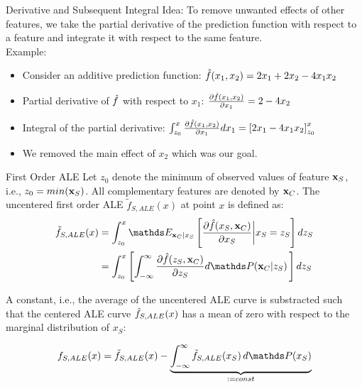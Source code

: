 \documentclass[11pt,compress,t,notes=noshow, xcolor=table]{beamer}
\begin{document}
\begin{vbframe}{Derivative and Subsequent Integral}
Idea: To remove unwanted effects of other features, we take the partial derivative of the prediction function with respect to a feature and integrate it with respect to the same feature. \\
\lz
Example:
\begin{itemize}
\item Consider an additive prediction function: $\fh(x_1, x_2) = 2x_1 + 2x_2 - 4x_1 x_2$
\lz
\item Partial derivative of $\fh$ with respect to $x_1$: $\frac{\partial \fh(x_1, x_2)}{\partial x_1} = 2 - 4x_2$
\lz
\item Integral of the partial derivative:  $\int_{z_0}^{x} \frac{\partial \fh(x_1, x_2)}{\partial x_1} dx_1 = \left[2x_1 - 4x_1 x_2\right]_{z_0}^{x}$
\lz
\item We removed the main effect of $x_2$ which was our goal.
\end{itemize}
\end{vbframe}


\begin{vbframe}{First Order ALE}
Let $z_0$ denote the minimum of observed values of feature $\xv_S$, i.e., $z_0 = min(\xv_S)$. All complementary features are denoted by $\xv_C$. The uncentered first order ALE $\tilde{f}_{S, ALE}(x)$ at point $x$ is defined as:
$$
\begin{aligned}
\tilde{f}_{S, ALE}(x) &= \int_{z_{0}}^{x} \E_{\xv_C \vert x_S} \left[\frac{\partial \fh(x_S, \xv_C)}{\partial x_S} \bigg \vert x_S = z_S \right] dz_S \\
&= \int_{z_{0}}^{x} \left[ \int_{-\infty}^{\infty}  \frac{\partial \fh(z_S, \xv_C)}{\partial z_S} d\P(\xv_C | z_S) \,   \right] dz_S
\end{aligned}
$$

A constant, i.e., the average of the uncentered ALE curve is substracted such that the centered ALE curve $\fh_{S, ALE}(x)$ has a mean of zero with respect to the marginal distribution of $x_S$:

$$
\begin{aligned}
f_{S, ALE}(x) = \tilde{f}_{S, ALE}(x) - \underbrace{\int_{-\infty}^{\infty}\tilde{f}_{S, ALE}(x_S) \, d\P(x_S)}_{:= const}
\end{aligned}
$$

\end{vbframe}
\end{document}
